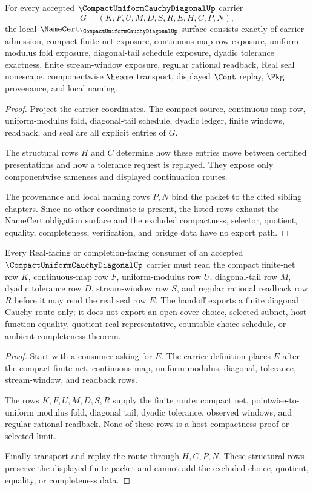 \begin{theorem}
\label{thm:compact-uniform-cauchy-diagonal-namecert-obligations}
For every accepted $\CompactUniformCauchyDiagonalUp$ carrier
$$
G=(K,F,U,M,D,S,R,E,H,C,P,N),
$$
the local $\NameCert_{\CompactUniformCauchyDiagonalUp}$ surface consists exactly of carrier admission, compact finite-net exposure, continuous-map row exposure, uniform-modulus fold exposure, diagonal-tail schedule exposure, dyadic tolerance exactness, finite stream-window exposure, regular rational readback, Real seal nonescape, componentwise $\hsame$ transport, displayed $\Cont$ replay, $\Pkg$ provenance, and local naming.
\end{theorem}
\begin{proof}
Project the carrier coordinates. The compact source, continuous-map row, uniform-modulus fold, diagonal-tail schedule, dyadic ledger, finite windows, readback, and seal are all explicit entries of $G$.

The structural rows $H$ and $C$ determine how these entries move between certified presentations and how a tolerance request is replayed. They expose only componentwise sameness and displayed continuation routes.

The provenance and local naming rows $P,N$ bind the packet to the cited sibling chapters. Since no other coordinate is present, the listed rows exhaust the NameCert obligation surface and the excluded compactness, selector, quotient, equality, completeness, verification, and bridge data have no export path.
\end{proof}

\begin{theorem}
\label{thm:compact-uniform-cauchy-diagonal-finite-net-handoff}
Every Real-facing or completion-facing consumer of an accepted $\CompactUniformCauchyDiagonalUp$ carrier must read the compact finite-net row $K$, continuous-map row $F$, uniform-modulus row $U$, diagonal-tail row $M$, dyadic tolerance row $D$, stream-window row $S$, and regular rational readback row $R$ before it may read the real seal row $E$. The handoff exports a finite diagonal Cauchy route only; it does not export an open-cover choice, selected subnet, host function equality, quotient real representative, countable-choice schedule, or ambient completeness theorem.
\end{theorem}
\begin{proof}
Start with a consumer asking for $E$. The carrier definition places $E$ after the compact finite-net, continuous-map, uniform-modulus, diagonal, tolerance, stream-window, and readback rows.

The rows $K,F,U,M,D,S,R$ supply the finite route: compact net, pointwise-to-uniform modulus fold, diagonal tail, dyadic tolerance, observed windows, and regular rational readback. None of these rows is a host compactness proof or selected limit.

Finally transport and replay the route through $H,C,P,N$. These structural rows preserve the displayed finite packet and cannot add the excluded choice, quotient, equality, or completeness data.
\end{proof}


